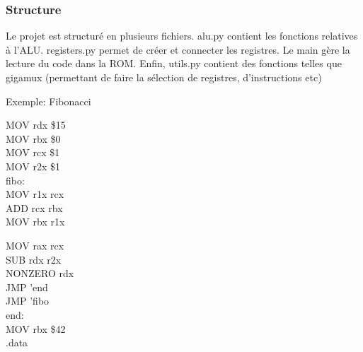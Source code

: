 \documentclass[12pt]{beamer}
\begin{document}
\begin{frame}
\frametitle{Structure}
   
   Le projet est structuré en plusieurs fichiers. alu.py contient les fonctions relatives à 
   l'ALU. registers.py permet de créer et connecter les registres. Le main gère la lecture du code
   dans la ROM. Enfin, utils.py contient des fonctions telles que gigamux (permettant de faire la sélection
   de registres, d'instructions etc)
\end{frame}

\begin{frame}{Exemple: Fibonacci}

    \begin{minipage}[t]{0.48\linewidth}
        MOV  rdx \$15 \\
        MOV  rbx \$0 \\
        MOV  rcx \$1 \\

        MOV  r2x \$1 \\
        fibo: \\
        MOV   r1x rcx \\
        ADD   rcx rbx \\
        MOV   rbx r1x \\
    \end{minipage}\hfill
    \begin{minipage}[t]{0.48\linewidth}
        MOV   rax rcx \\
        SUB   rdx r2x \\
        NONZERO rdx \\
        JMP   'end \\
        JMP   'fibo \\
        
        end: \\
            MOV rbx \$42 \\
        
        .data \\
        \end{minipage}

\end{frame}
\end{document}
